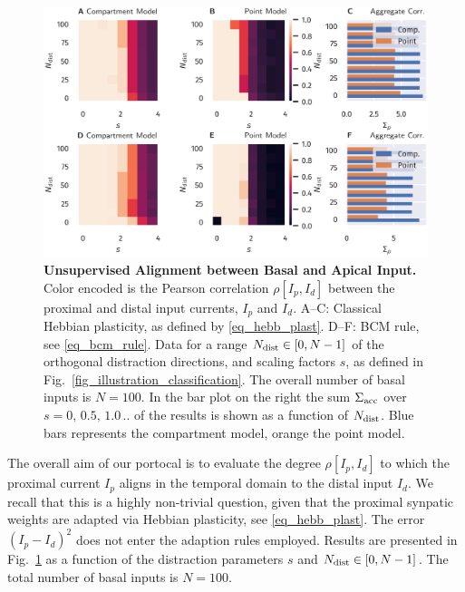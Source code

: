 \documentclass[utf8]{frontiersSCNS} %
\begin{document}
\begin{figure}[t]
\centering
\includegraphics[width=1.0\columnwidth]{corr_dimension_scaling_high_input_dim_composite}
\caption{{\bf Unsupervised Alignment between 
Basal and Apical Input.} Color
encoded is the Pearson correlation $\rho[I_p,I_d]$ 
between the proximal and distal input currents,
$I_p$ and $I_d$. A--C: Classical Hebbian 
plasticity, as defined by \eqref{eq_hebb_plast}.
D--F: BCM rule, see \eqref{eq_bcm_rule}. 
Data for a range $N_{\rm dist}\in[0,N-1]$
of the orthogonal distraction directions, 
and scaling factors $s$, as defined in
Fig.~\ref{fig_illustration_classification}.
The overall number of basal inputs is $N=100$.
In the bar plot on the right the sum
$\Sigma_{\rm acc}$ over $s=0,\,0.5,\,1.0\,..$ 
of the results is shown as a function
of $N_{\rm dist}$. Blue bars represents 
the compartment model, orange the point model.}
\label{fig_corr_dimension_scaling}
\end{figure}

The overall aim of our portocal is to evaluate
the degree $\rho[I_p,I_d]$ to which
the proximal current $I_p$ aligns in the
temporal domain to the distal input $I_d$.
We recall that this is a highly non-trivial
question, given that the proximal synpatic
weights are adapted via Hebbian plasticity, 
see \eqref{eq_hebb_plast}. The error 
$(I_p-I_d)^2$ does not
enter the adaption rules employed.
Results are presented in
Fig.~\ref{fig_corr_dimension_scaling}
as a function of the distraction parameters 
$s$ and $N_{\rm dist}\in[0,N-1]$. The
total number of basal inputs is $N=100$.
\end{document}
